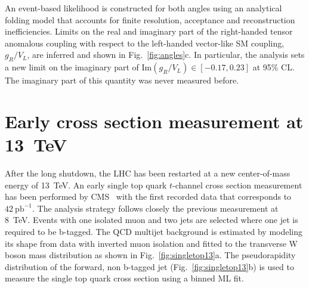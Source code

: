 \documentclass{PoS}
\begin{document}
An event-based likelihood is constructed for both angles using an analytical folding model that accounts for finite resolution, acceptance and reconstruction inefficiencies. Limits on the real and imaginary part of the right-handed tensor anomalous coupling with respect to the left-handed vector-like SM coupling, $g_{R}/V_{L}$, are inferred and shown in Fig.~\ref{fig:angles}c. In particular, the analysis sets a new limit on the imaginary part of $\mathrm{Im}(g_{R}/V_{L})\in[-0.17,0.23]$ at 95\% CL. The imaginary part of this quantity was never measured before.


\section{Early cross section measurement at 13~TeV}

After the long shutdown, the LHC has been restarted at a new center-of-mass energy of 13~TeV. An early single top quark $t$-channel cross section measurement has been performed by CMS~\cite{CMS-PAS-TOP-15-004} with the first recorded data that corresponds to $42~\mathrm{pb}^{-1}$.
The analysis strategy follows closely the previous measurement at 8~TeV. Events with one isolated muon and two jets are selected where one jet is required to be b-tagged. The QCD multijet background is estimated by modeling its shape from data with inverted muon isolation and fitted to the transverse W boson mass distribution as shown in Fig.~\ref{fig:singletop13}a. The pseudorapidity distribution of the forward, non b-tagged jet (Fig.~\ref{fig:singletop13}b) is used to measure the single top quark cross section using a binned ML fit.
\end{document}
